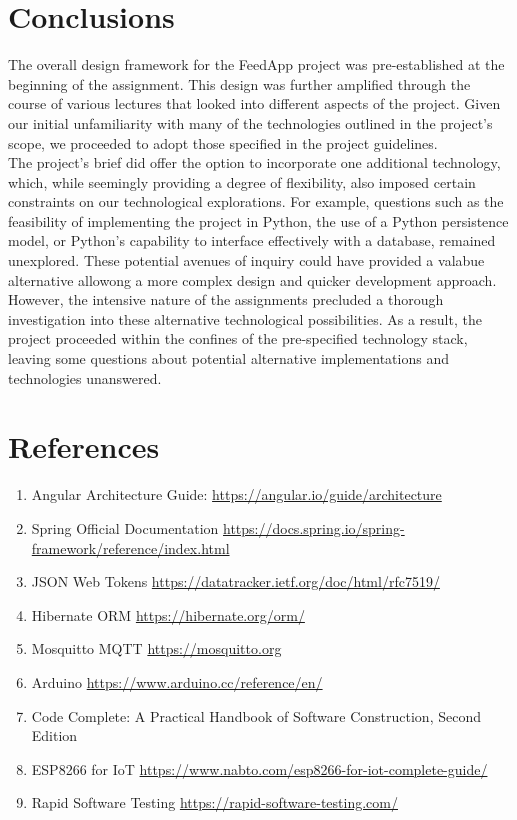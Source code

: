 \clearpage
\section{Conclusions}

\noindent The overall design framework for the FeedApp project was pre-established at the beginning of the assignment. This design was further amplified through the course of various lectures that looked into different aspects of the project.  Given our initial unfamiliarity with many of the technologies outlined in the project's scope, we proceeded to adopt those specified in the project guidelines.\\

\noindent The project's brief did offer the option to incorporate one additional technology, which, while seemingly providing a degree of flexibility, also imposed certain constraints on our technological explorations. For example, questions such as the feasibility of implementing the project in Python, the use of a Python persistence model, or Python's capability to interface effectively with a database, remained unexplored. These potential avenues of inquiry could have provided a valabue alternative allowong a more complex design and quicker development approach.\\

\noindent However, the intensive nature of the assignments precluded a thorough investigation into these alternative technological possibilities. As a result, the project proceeded within the confines of the pre-specified technology stack, leaving some questions about potential alternative implementations and technologies unanswered.

\section*{References}
\begin{enumerate}
  	\item Angular Architecture Guide: \url{https://angular.io/guide/architecture }
	\item Spring Official Documentation \url{https://docs.spring.io/spring-framework/reference/index.html}
          \item JSON Web Tokens  \url{https://datatracker.ietf.org/doc/html/rfc7519/}
 	\item Hibernate ORM \url{https://hibernate.org/orm/}
	\item Mosquitto MQTT \url{https://mosquitto.org}
	\item Arduino \url{https://www.arduino.cc/reference/en/}
	\item Code Complete: A Practical Handbook of Software Construction, Second Edition 
  	\item ESP8266 for IoT \url{https://www.nabto.com/esp8266-for-iot-complete-guide/}
	\item Rapid Software Testing  \url{https://rapid-software-testing.com/}
\end{enumerate}